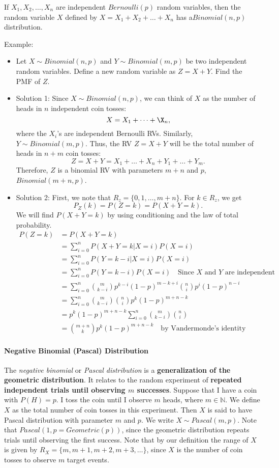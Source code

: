 If $X_1,X_2,\dots,X_n$ are independent $Bernoulli(p)$ random variables, then the random variable $X$ defined by $X=X_1+X_2+\dots+X_n$ has a$Binomial(n,p)$ distribution. 


Example: 
\begin{itemize}
	\item Let $X\sim Binomial(n,p)$ and $Y\sim Binomial(m,p)$ be two independent random variables. Define a new random variable as $Z=X+Y$. Find the PMF of $Z$.
	\item Solution 1: Since $X\sim Binomial(n,p)$, we can think of $X$ as the number of heads in $n$ independent coin tosses: 
	$$X = X_1+\dots+\X_n,$$
	where the $X_i$'s are independent Bernoulli RVs. Similarly, $Y\sim Binomial(m,p)$.
	Thus, the RV $Z=X+Y$ will be the total number of heads in $n+m$ coin tosses:
	$$Z = X+Y=X_1+\dots+X_n+Y_1+\dots+Y_m.$$
	Therefore, $Z$ is a binomial RV with parameters $m+n$ and $p$, \ie $Binomial(m+n, p)$.
	\item Solution 2: First, we note that $R_z = \{0,1,\dots,m+n\}$. For $k\in R_z$, we get
		$$P_Z(k) = P(Z=k) = P(X+Y=k).$$
		We will find $P(X+Y=k)$ by using conditioning and the law of total probability. 
		\begin{align*}
			P(Z=k) &= P(X+Y=k)\\
				   &= \sum_{i=0}^{n}P(X+Y=k|X=i)P(X=i)\\
				   &= \sum_{i=0}^{n}P(Y=k-i|X=i)P(X=i)\\
				   &= \sum_{i=0}^{n}P(Y=k-i)P(X=i)\quad \text{Since $X$ and $Y$ are independent}\\
				   &= \sum_{i=0}^{n}\binom{m}{k-i}p^{k-i}(1-p)^{m-k+i}\binom{n}{i}p^i(1-p)^{n-i}\\
				   &= \sum_{i=0}^{n}\binom{m}{k-i}\binom{n}{i}p^k(1-p)^{m+n-k}\\
				   &= p^k(1-p)^{m+n-k}\sum_{i=0}^{n}\binom{m}{k-i}\binom{n}{i}\\
				   &= \binom{m+n}{k}p^k(1-p)^{m+n-k}\quad \text{by Vandermonde's identity}
		\end{align*}
\end{itemize}

\paragraph{Negative Binomial (Pascal) Distribution}
The \textit{negative binomial} or \textit{Pascal distribution} is a \textbf{generalization of the geometric distribution}. It relates to the random experiment of \textbf{repeated independent trials until observing $m$ successes}. Suppose that I have a coin with $P(H)=p$. I toss the coin until I observe $m$ heads, where $m\in \mathbb{N}$. We define $X$ as the total number of coin tosses in this experiment. Then $X$ is said to have Pascal distribution with parameter $m$ and $p$. We write $X\sim Pascal(m,p)$. Note that $Pascal(1,p=Geometric(p))$, since the geometric distribution repeats trials until observing the first success. Note that by our definition the range of $X$ is given by $R_X=\{m, m+1, m+2, m+3, \dots\}$, since $X$ is the number of coin tosses to observe $m$ target events.

